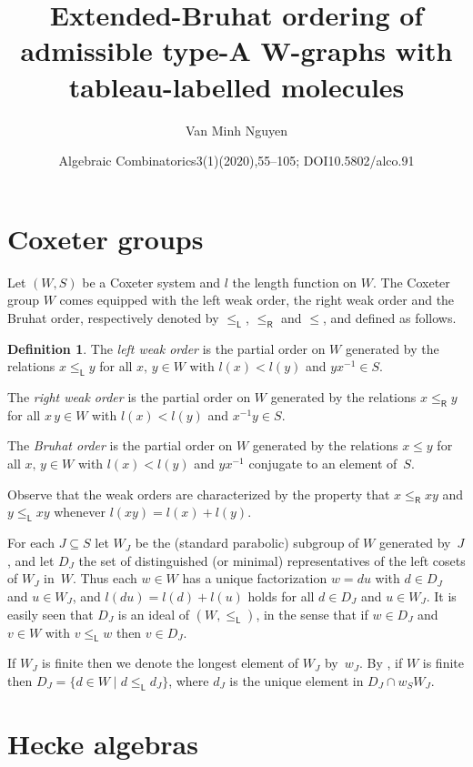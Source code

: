 \documentclass[10pt]{amsart}
\title[Ordering of admissible type-A W-graphs]{Extended-Bruhat ordering of admissible type-A W-graphs with tableau-labelled molecules}
\author{Van Minh Nguyen}
\date{Algebraic Combinatorics3(1)(2020),55–105; DOI10.5802/alco.91}
\theoremstyle{definition}
\newtheorem{defi}[theo]{Definition}
\newcommand{\lside}{_{\mathsf{L}}}
\newcommand{\rside}{_{\mathsf{R}}}
\begin{document}
\maketitle
\setcounter{section}{1}
\section{Coxeter groups}
\label{sec:2}
Let $(W,S)$ be a Coxeter system and $l$ the length function on $W$.
The Coxeter group $W$ comes equipped with the left weak
order, the right weak order and the Bruhat order, respectively denoted by
$\leqslant\lside$, $\leqslant\rside$ and $\leqslant$, and defined as follows.

\begin{defi}\label{Orders_on_W}
The \emph{left weak order} is the partial order on $W$ generated by
the relations $x\leqslant\lside y$ for all $x,\,y\in W$
with $l(x)<l(y)$ and $yx^{-1}\in S$.

The \emph{right weak order} is the partial order on $W$ generated by
the relations $x\leqslant\rside y$ for all $x\,y\in W$
with $l(x)<l(y)$ and $x^{-1}y\in S$.

The \emph{Bruhat order} is the partial order on $W$ generated by
the relations $x\leqslant y$ for all $x,\,y\in W$
with $l(x)<l(y)$ and $yx^{-1}$ conjugate to an element of~$S$.
\end{defi}

Observe that the weak orders are characterized by the property that
$x\leqslant\rside xy$ and $y\leqslant\lside xy$ whenever $l(xy)=l(x)+l(y)$.

For each $J\subseteq S$ let $W_{J}$ be the (standard parabolic)
subgroup of $W$ generated by~$J$, and let $D_{J}$ the set of
distinguished (or minimal) representatives of the left cosets of
$W_{J}$ in~$W$. Thus each $w \in W$ has a unique factorization
$w = du$ with $d \in D_{J}$ and $u \in W_{J}$, and $l(du) = l(d) +l(u)$
holds for all $d \in D_{J}$ and $u \in W_{J}$. It is easily seen
that $D_J$ is an ideal of $(W,\leqslant\lside)$, in the sense that if
$w\in D_J$ and $v\in W$ with $v\leqslant\lside w$ then $v\in D_J$.

If $W_J$ is finite then we denote the longest element of $W_{J}$
by~$w_{J}$. By \cite[Lemma~2.2.1]{gecpfei:charHecke}, if $W$ is finite then
$D_{J} = \{d\in W\mid d\leqslant\lside d_J\}$, where $d_{J}$ is
the unique element in $D_{J} \cap w_{S}W_{J}$.

\section{Hecke algebras}
\label{sec:2'}
\end{document}
